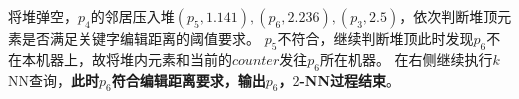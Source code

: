 \documentclass{ML}
\def\n{2} %
\def\maxxy{6} %
\begin{document}
将堆弹空，$p_4$的邻居压入堆$(p_5, 1.141), (p_6, 2.236), (p_3, 2.5)$，依次判断堆顶元素是否满足关键字编辑距离的阈值要求。
$p_5$不符合，继续判断堆顶此时发现$p_6$不在本机器上，故将堆内元素和当前的$counter$发往$p_6$所在机器。
在右侧继续执行$k$NN查询，\textbf{此时$p_6$符合编辑距离要求，输出$p_6$，$2$-NN过程结束}。
\begin{figure}[H]
  \centering
\end{figure}
\end{document}
